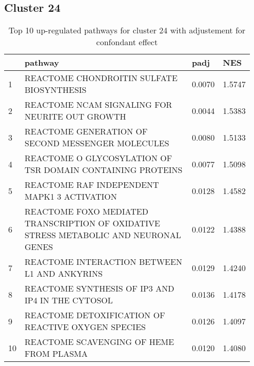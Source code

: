 \documentclass{article}
\begin{document}
\subsection{Cluster 24 }
\begin{table}[H]
\centering
\begin{tabular}{p{0.05\linewidth}p{0.7\linewidth}p{0.1\linewidth}p{0.1\linewidth}}
  \hline
 & pathway & padj & NES \\ 
  \hline
1 & REACTOME CHONDROITIN SULFATE BIOSYNTHESIS & 0.0070 & 1.5747 \\ 
  2 & REACTOME NCAM SIGNALING FOR NEURITE OUT GROWTH & 0.0044 & 1.5383 \\ 
  3 & REACTOME GENERATION OF SECOND MESSENGER MOLECULES & 0.0080 & 1.5133 \\ 
  4 & REACTOME O GLYCOSYLATION OF TSR DOMAIN CONTAINING PROTEINS & 0.0077 & 1.5098 \\ 
  5 & REACTOME RAF INDEPENDENT MAPK1 3 ACTIVATION & 0.0128 & 1.4582 \\ 
  6 & REACTOME FOXO MEDIATED TRANSCRIPTION OF OXIDATIVE STRESS METABOLIC AND NEURONAL GENES & 0.0122 & 1.4388 \\ 
  7 & REACTOME INTERACTION BETWEEN L1 AND ANKYRINS & 0.0129 & 1.4240 \\ 
  8 & REACTOME SYNTHESIS OF IP3 AND IP4 IN THE CYTOSOL & 0.0136 & 1.4178 \\ 
  9 & REACTOME DETOXIFICATION OF REACTIVE OXYGEN SPECIES & 0.0126 & 1.4097 \\ 
  10 & REACTOME SCAVENGING OF HEME FROM PLASMA & 0.0120 & 1.4080 \\ 
   \hline
\end{tabular}
\caption{Top 10 up-regulated pathways for cluster 24 with adjustement for confondant effect} 
\label{tab:q3_2_conf_24}
\end{table}
\end{document}
